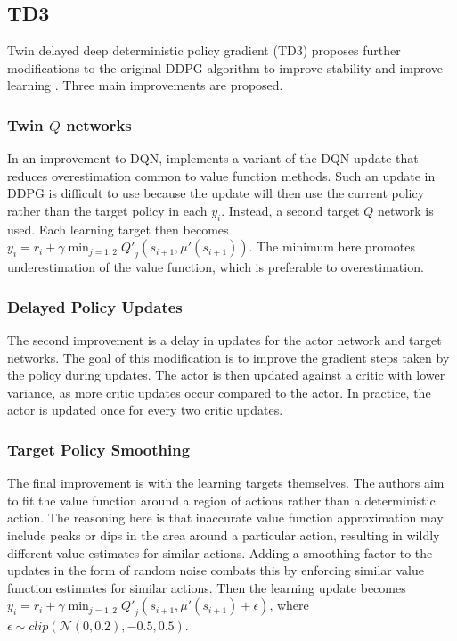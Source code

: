 \documentclass[10pt,twocolumn,letterpaper]{article}
\begin{document}
\subsection{TD3}
Twin delayed deep deterministic policy gradient (TD3) proposes further modifications to the original DDPG algorithm to improve stability and improve learning \cite{td3}.
Three main improvements are proposed.

\subsubsection{Twin $Q$ networks}
In an improvement to DQN, \cite{double_dqn} implements a variant of the DQN update that reduces overestimation common to value function methods.
Such an update in DDPG is difficult to use because the update will then use the current policy rather than the target policy in each $y_i$.
Instead, a second target $Q$ network is used.
Each learning target then becomes $\displaystyle y_i = r_i + \gamma \min_{j=1, 2}{{Q'}_j(s_{i + 1}, \mu'(s_{i + 1}))}$.
The minimum here promotes underestimation of the value function, which is preferable to overestimation.

\subsubsection{Delayed Policy Updates}
The second improvement is a delay in updates for the actor network and target networks.
The goal of this modification is to improve the gradient steps taken by the policy during updates.
The actor is then updated against a critic with lower variance, as more critic updates occur compared to the actor.
In practice, the actor is updated once for every two critic updates.

\subsubsection{Target Policy Smoothing}
The final improvement is with the learning targets themselves.
The authors aim to fit the value function around a region of actions rather than a deterministic action. 
The reasoning here is that inaccurate value function approximation may include peaks or dips in the area around a particular action, resulting in wildly different value estimates for similar actions.
Adding a smoothing factor to the updates in the form of random noise combats this by enforcing similar value function estimates for similar actions.
Then the learning update becomes $\displaystyle y_i = r_i + \gamma \min_{j=1, 2}{{Q'}_j(s_{i + 1}, \mu'(s_{i+1}) + \epsilon)}$, where $\epsilon \sim clip(\mathcal{N}(0, 0.2), -0.5, 0.5)$.
\end{document}
